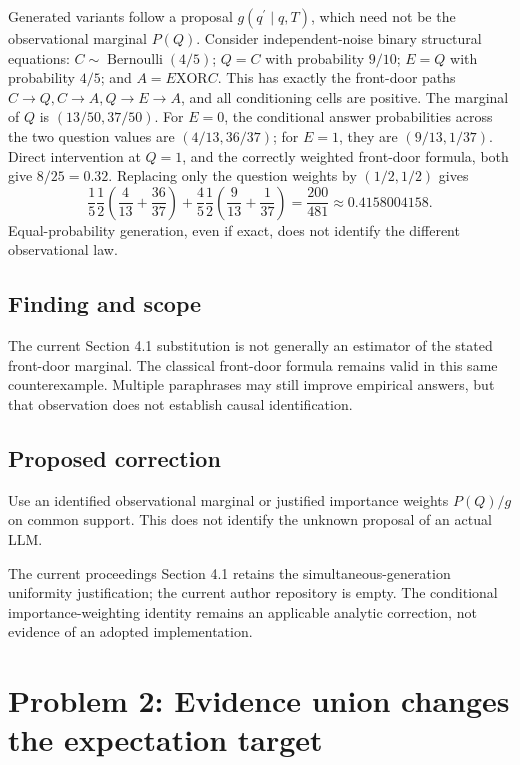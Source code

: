 \documentclass[11pt]{article}
\begin{document}
Generated variants follow a proposal \(g(q^{\prime}\mid q,T)\), which need not be the observational marginal \(P(Q)\). Consider independent-noise binary structural equations: \(C\sim\operatorname{Bernoulli}(4/5)\); \(Q=C\) with probability \(9/10\); \(E=Q\) with probability \(4/5\); and \(A=E\mathbin{\mathrm{XOR}}C\). This has exactly the front-door paths \(C\to Q,C\to A,Q\to E\to A\), and all conditioning cells are positive. The marginal of \(Q\) is \((13/50,37/50)\). For \(E=0\), the conditional answer probabilities across the two question values are \((4/13,36/37)\); for \(E=1\), they are \((9/13,1/37)\). Direct intervention at \(Q=1\), and the correctly weighted front-door formula, both give \(8/25=0.32\). Replacing only the question weights by \((1/2,1/2)\) gives \[\frac15\frac12\left(\frac4{13}+\frac{36}{37}\right)+\frac45\frac12\left(\frac9{13}+\frac1{37}\right)=\frac{200}{481}\approx0.4158004158.\] Equal-probability generation, even if exact, does not identify the different observational law.

\subsection*{Finding and scope}

The current Section 4.1 substitution is not generally an estimator of the stated front-door marginal. The classical front-door formula remains valid in this same counterexample. Multiple paraphrases may still improve empirical answers, but that observation does not establish causal identification.

\subsection*{Proposed correction}

Use an identified observational marginal or justified importance weights \(P(Q)/g\) on common support. This does not identify the unknown proposal of an actual LLM.

The current proceedings Section 4.1 retains the simultaneous-generation uniformity justification; the current author repository is empty. The conditional importance-weighting identity remains an applicable analytic correction, not evidence of an adopted implementation.

\section*{Problem 2: Evidence union changes the expectation target}
\end{document}
